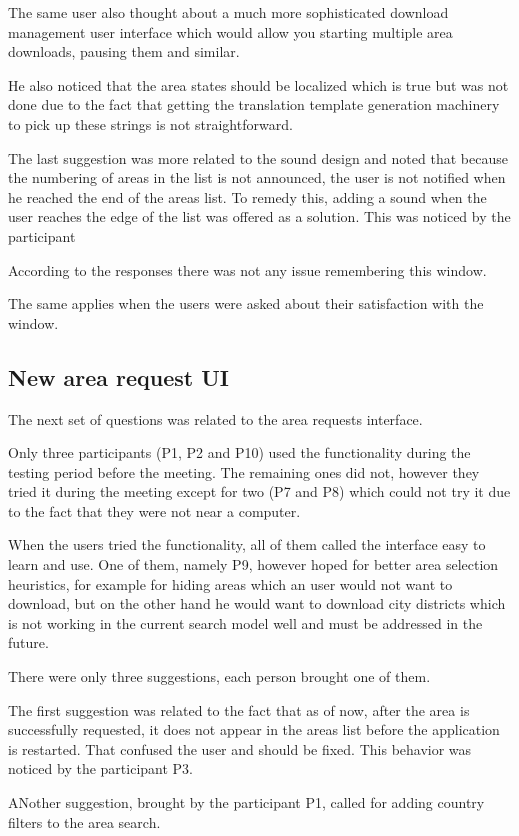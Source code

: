 \documentclass[nolof,digital]{fithesis3}
\begin{document}
The same user also thought about a much more sophisticated download management user interface which would allow you starting multiple area downloads, pausing them and similar.

He also noticed that the area states should be localized which is true but was not done due to the fact that getting the translation template generation machinery to pick up these strings is not straightforward.

The last suggestion was more related to the sound design and noted that because the numbering of areas in the list is not announced, the user is not notified when he reached the end of the areas list. To remedy this, adding a sound when the user reaches the edge of the list was offered as a solution. This was noticed by the participant 

According to the responses there was not any issue remembering this window.

The same applies when the users were asked about their satisfaction with the window.
\subsection{New area request UI}
The next set of questions was related to the area requests interface.

Only three participants (P1, P2 and P10) used the functionality during the testing period before the meeting. The remaining ones did not, however they tried it during the meeting except for two (P7 and P8) which could not try it due to the fact that they were not near a computer.

When the users tried the functionality, all of them called the interface easy to learn and use. One of them, namely P9, however hoped for better area selection heuristics, for example for hiding areas which an user would not want to download, but on the other hand he would want to download city districts which is not working in the current search model well and must be addressed in the future.

There were only three suggestions, each person brought one of them.

The first suggestion was related to the fact that as of now, after the area is successfully requested, it does not appear in the areas list before the application is restarted. That confused the user and should be fixed. This behavior was noticed by the participant P3.

ANother suggestion, brought by the participant P1, called for adding country filters to the area search. 
\end{document}
